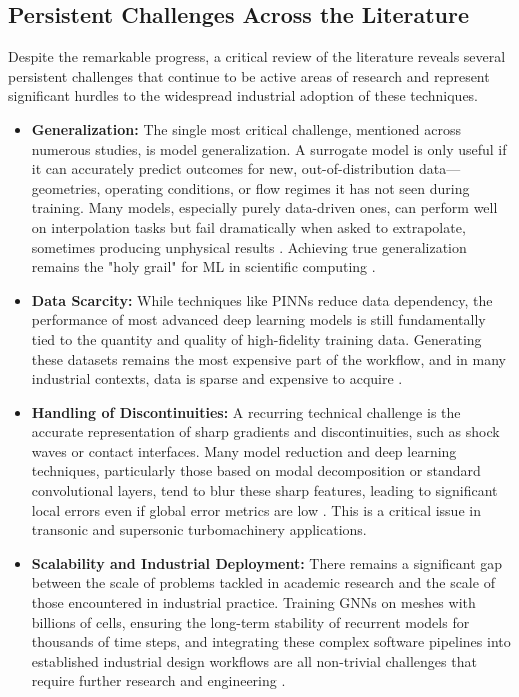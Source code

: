 \documentclass[dsc, EN]{ufabcFHZh}
\begin{document}
\subsection{Persistent Challenges Across the Literature}

Despite the remarkable progress, a critical review of the literature reveals several persistent challenges that continue to be active areas of research and represent significant hurdles to the widespread industrial adoption of these techniques.

\begin{itemize}
    \item \textbf{Generalization:} The single most critical challenge, mentioned across numerous studies, is model generalization. A surrogate model is only useful if it can accurately predict outcomes for new, out-of-distribution data—geometries, operating conditions, or flow regimes it has not seen during training. Many models, especially purely data-driven ones, can perform well on interpolation tasks but fail dramatically when asked to extrapolate, sometimes producing unphysical results \citep{synthesized2024}. Achieving true generalization remains the "holy grail" for ML in scientific computing \citep{SURF_benchmark}.
    \item \textbf{Data Scarcity:} While techniques like PINNs reduce data dependency, the performance of most advanced deep learning models is still fundamentally tied to the quantity and quality of high-fidelity training data. Generating these datasets remains the most expensive part of the workflow, and in many industrial contexts, data is sparse and expensive to acquire \citep{synthesized2024}.
    \item \textbf{Handling of Discontinuities:} A recurring technical challenge is the accurate representation of sharp gradients and discontinuities, such as shock waves or contact interfaces. Many model reduction and deep learning techniques, particularly those based on modal decomposition or standard convolutional layers, tend to blur these sharp features, leading to significant local errors even if global error metrics are low \citep{synthesized2024}. This is a critical issue in transonic and supersonic turbomachinery applications.
    \item \textbf{Scalability and Industrial Deployment:} There remains a significant gap between the scale of problems tackled in academic research and the scale of those encountered in industrial practice. Training GNNs on meshes with billions of cells, ensuring the long-term stability of recurrent models for thousands of time steps, and integrating these complex software pipelines into established industrial design workflows are all non-trivial challenges that require further research and engineering \citep{synthesized2024}.
\end{itemize}
\end{document}
